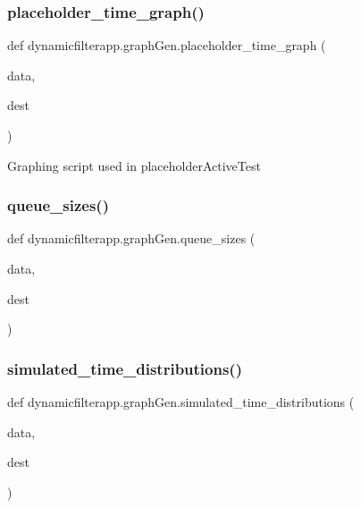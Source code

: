\subsubsection{\texorpdfstring{placeholder\+\_\+time\+\_\+graph()}{placeholder\_time\_graph()}}
{\footnotesize\ttfamily def dynamicfilterapp.\+graph\+Gen.\+placeholder\+\_\+time\+\_\+graph (\begin{DoxyParamCaption}\item[{}]{data,  }\item[{}]{dest }\end{DoxyParamCaption})}

\begin{DoxyVerb}Graphing script used in placeholderActiveTest
\end{DoxyVerb}
 \mbox{\label{namespacedynamicfilterapp_1_1graph_gen_a209f6a234ddb6528b7c7df731a0bd5ed}} 
\subsubsection{\texorpdfstring{queue\+\_\+sizes()}{queue\_sizes()}}
{\footnotesize\ttfamily def dynamicfilterapp.\+graph\+Gen.\+queue\+\_\+sizes (\begin{DoxyParamCaption}\item[{}]{data,  }\item[{}]{dest }\end{DoxyParamCaption})}

\mbox{\label{namespacedynamicfilterapp_1_1graph_gen_a50af14aa0304c1716efb3f629e2655b4}} 
\subsubsection{\texorpdfstring{simulated\+\_\+time\+\_\+distributions()}{simulated\_time\_distributions()}}
{\footnotesize\ttfamily def dynamicfilterapp.\+graph\+Gen.\+simulated\+\_\+time\+\_\+distributions (\begin{DoxyParamCaption}\item[{}]{data,  }\item[{}]{dest }\end{DoxyParamCaption})}

